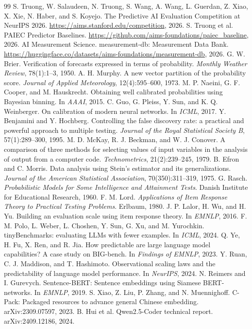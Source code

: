 \documentclass{article}
\begin{document}
\begin{thebibliography}{99}
 S. Truong, W. Salaudeen, N. Truong, S. Wang, A. Wang, L. Guerdan, Z. Xiao, X. Xie, N. Haber, and S. Koyejo. The Predictive AI Evaluation Competition at NeurIPS 2026. \url{https://aims.stanford.edu/competition}, 2026.
 S. Truong et al. PAIEC Predictor Baselines. \url{https://github.com/aims-foundations/paiec_baseline}, 2026.
 AI Measurement Science. measurement-db: Measurement Data Bank. \url{https://huggingface.co/datasets/aims-foundations/measurement-db}, 2026.
 G. W. Brier. Verification of forecasts expressed in terms of probability. \emph{Monthly Weather Review}, 78(1):1--3, 1950.
 A. H. Murphy. A new vector partition of the probability score. \emph{Journal of Applied Meteorology}, 12(4):595--600, 1973.
 M. P. Naeini, G. F. Cooper, and M. Hauskrecht. Obtaining well calibrated probabilities using Bayesian binning. In \emph{AAAI}, 2015.
 C. Guo, G. Pleiss, Y. Sun, and K. Q. Weinberger. On calibration of modern neural networks. In \emph{ICML}, 2017.
 Y. Benjamini and Y. Hochberg. Controlling the false discovery rate: a practical and powerful approach to multiple testing. \emph{Journal of the Royal Statistical Society B}, 57(1):289--300, 1995.
 M. D. McKay, R. J. Beckman, and W. J. Conover. A comparison of three methods for selecting values of input variables in the analysis of output from a computer code. \emph{Technometrics}, 21(2):239--245, 1979.
 B. Efron and C. Morris. Data analysis using Stein's estimator and its generalizations. \emph{Journal of the American Statistical Association}, 70(350):311--319, 1975.
 G. Rasch. \emph{Probabilistic Models for Some Intelligence and Attainment Tests}. Danish Institute for Educational Research, 1960.
 F. M. Lord. \emph{Applications of Item Response Theory to Practical Testing Problems}. Erlbaum, 1980.
 J. P. Lalor, H. Wu, and H. Yu. Building an evaluation scale using item response theory. In \emph{EMNLP}, 2016.
 F. M. Polo, L. Weber, L. Choshen, Y. Sun, G. Xu, and M. Yurochkin. tinyBenchmarks: evaluating LLMs with fewer examples. In \emph{ICML}, 2024.
 Q. Ye, H. Fu, X. Ren, and R. Jia. How predictable are large language model capabilities? A case study on BIG-bench. In \emph{Findings of EMNLP}, 2023.
 Y. Ruan, C. J. Maddison, and T. Hashimoto. Observational scaling laws and the predictability of language model performance. In \emph{NeurIPS}, 2024.
 N. Reimers and I. Gurevych. Sentence-BERT: Sentence embeddings using Siamese BERT-networks. In \emph{EMNLP}, 2019.
 S. Xiao, Z. Liu, P. Zhang, and N. Muennighoff. C-Pack: Packaged resources to advance general Chinese embedding. arXiv:2309.07597, 2023.
 B. Hui et al. Qwen2.5-Coder technical report. arXiv:2409.12186, 2024.
\end{thebibliography}
\end{document}

